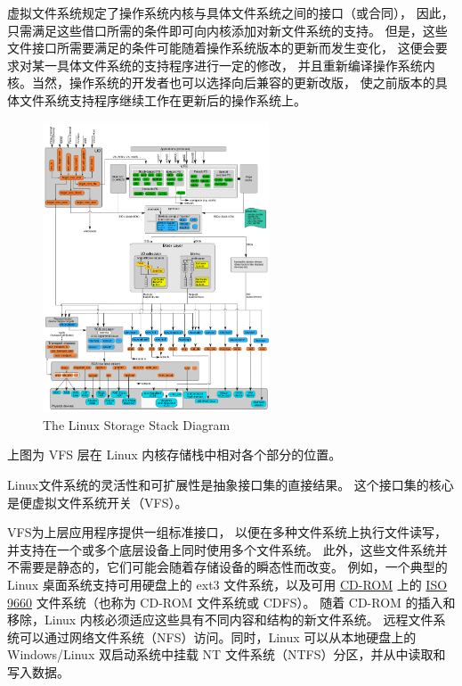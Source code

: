 \documentclass[UTF8,a4paper]{ctexart}
\begin{document}
虚拟文件系统规定了操作系统内核与具体文件系统之间的接口（或合同），
因此，只需满足这些借口所需的条件即可向内核添加对新文件系统的支持。
但是，这些文件接口所需要满足的条件可能随着操作系统版本的更新而发生变化，
这便会要求对某一具体文件系统的支持程序进行一定的修改，
并且重新编译操作系统内核。当然，操作系统的开发者也可以选择向后兼容的更新改版，
使之前版本的具体文件系统支持程序继续工作在更新后的操作系统上。

\begin{figure}[H]
    \centering
    \includegraphics[width=0.6\textwidth]{The_Linux_Storage_Stack_Diagram.png}
    \caption{The Linux Storage Stack Diagram}
\end{figure}

上图为 VFS 层在 Linux 内核存储栈中相对各个部分的位置。

Linux文件系统的灵活性和可扩展性是抽象接口集的直接结果。
这个接口集的核心是便虚拟文件系统开关（VFS）。

VFS为上层应用程序提供一组标准接口，
以便在多种文件系统上执行文件读写，
并支持在一个或多个底层设备上同时使用多个文件系统。
此外，这些文件系统并不需要是静态的，它们可能会随着存储设备的瞬态性而改变。
例如，一个典型的
Linux 桌面系统支持可用硬盘上的 ext3 文件系统，以及可用
\href{https://en.wikipedia.org/wiki/CD-ROM}{CD-ROM} 上的
\href{https://en.wikipedia.org/wiki/ISO_9660}{ISO 9660} 
文件系统（也称为
CD-ROM 文件系统或 CDFS）。
随着 CD-ROM 的插入和移除，Linux
内核必须适应这些具有不同内容和结构的新文件系统。
远程文件系统可以通过网络文件系统（NFS）访问。同时，Linux
可以从本地硬盘上的 Windows/Linux 双启动系统中挂载 NT
文件系统（NTFS）分区，并从中读取和写入数据。
\end{document}
